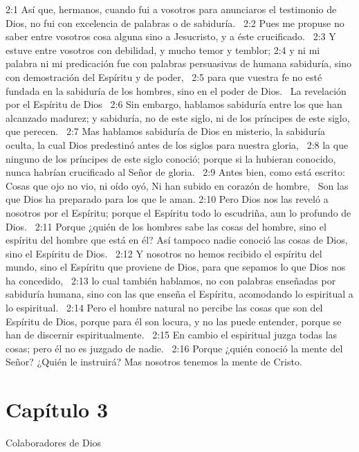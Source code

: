2:1 Así que, hermanos, cuando fui a vosotros para anunciaros el testimonio de Dios, no fui con excelencia de palabras o de sabiduría.  
2:2 Pues me propuse no saber entre vosotros cosa alguna sino a Jesucristo, y a éste crucificado.  
2:3 Y estuve entre vosotros con debilidad, y mucho temor y temblor; 
2:4 y ni mi palabra ni mi predicación fue con palabras persuasivas de humana sabiduría, sino con demostración del Espíritu y de poder,  
2:5 para que vuestra fe no esté fundada en la sabiduría de los hombres, sino en el poder de Dios.  
La revelación por el Espíritu de Dios  
2:6 Sin embargo, hablamos sabiduría entre los que han alcanzado madurez; y sabiduría, no de este siglo, ni de los príncipes de este siglo, que perecen.  
2:7 Mas hablamos sabiduría de Dios en misterio, la sabiduría oculta, la cual Dios predestinó antes de los siglos para nuestra gloria,  
2:8 la que ninguno de los príncipes de este siglo conoció; porque si la hubieran conocido, nunca habrían crucificado al Señor de gloria.  
2:9 Antes bien, como está escrito:  
Cosas que ojo no vio, ni oído oyó, 
Ni han subido en corazón de hombre,  
Son las que Dios ha preparado para los que le aman. 
2:10 Pero Dios nos las reveló a nosotros por el Espíritu; porque el Espíritu todo lo escudriña, aun lo profundo de Dios.  
2:11 Porque ¿quién de los hombres sabe las cosas del hombre, sino el espíritu del hombre que está en él? Así tampoco nadie conoció las cosas de Dios, sino el Espíritu de Dios.  
2:12 Y nosotros no hemos recibido el espíritu del mundo, sino el Espíritu que proviene de Dios, para que sepamos lo que Dios nos ha concedido,  
2:13 lo cual también hablamos, no con palabras enseñadas por sabiduría humana, sino con las que enseña el Espíritu, acomodando lo espiritual a lo espiritual.  
2:14 Pero el hombre natural no percibe las cosas que son del Espíritu de Dios, porque para él son locura, y no las puede entender, porque se han de discernir espiritualmente.  
2:15 En cambio el espiritual juzga todas las cosas; pero él no es juzgado de nadie.  
2:16 Porque ¿quién conoció la mente del Señor? ¿Quién le instruirá? Mas nosotros tenemos la mente de Cristo.  
\section*{Capítulo 3}
Colaboradores de Dios  

